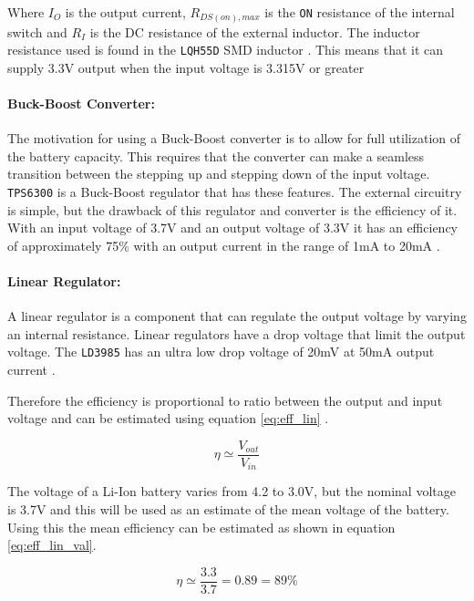 Where $I_O$ is the output current, $R_{DS(on),max}$ is the \texttt{ON} resistance of the internal switch and $R_I$ is the DC resistance of the external inductor.
The inductor resistance used is found in the \texttt{LQH55D} SMD inductor \cite{LQH55D}.
This means that it can supply 3.3V output when the input voltage is 3.315V or greater



\paragraph{Buck-Boost Converter:}
The motivation for using a Buck-Boost converter is to allow for full utilization of the battery capacity.
This requires that the converter can make a seamless transition between the stepping up and stepping down of the input voltage. 
\texttt{TPS6300} is a Buck-Boost regulator that has these features.
The external circuitry is simple, but the drawback of this regulator and converter is the efficiency of it.
With an input voltage of 3.7V and an output voltage of 3.3V it has an efficiency of approximately 75\% with an output current in the range of 1mA to 20mA \cite{TPS6300}.

\paragraph{Linear Regulator:}
A linear regulator is a component that can regulate the output voltage by varying an internal resistance.
Linear regulators have a drop voltage that limit the output voltage. 
The \texttt{LD3985} has an ultra low drop voltage of 20mV at 50mA output current \cite{LD3985}.

Therefore the efficiency is proportional to ratio between the output and input voltage and can be estimated using equation \ref{eq:eff_lin} \cite{ap_note_140}.

\begin{equation}
	\eta \simeq \frac{V_{out}}{V_{in}}
	\label{eq:eff_lin}
\end{equation}

The voltage of a Li-Ion battery varies from 4.2 to 3.0V, but the nominal voltage is 3.7V and this will be used as an estimate of the mean voltage of the battery.
Using this the mean efficiency can be estimated as shown in equation \ref{eq:eff_lin_val}.

\begin{equation}
	\eta \simeq \frac{3.3}{3.7} = 0.89 = 89\%
	\label{eq:eff_lin_val}
\end{equation}


